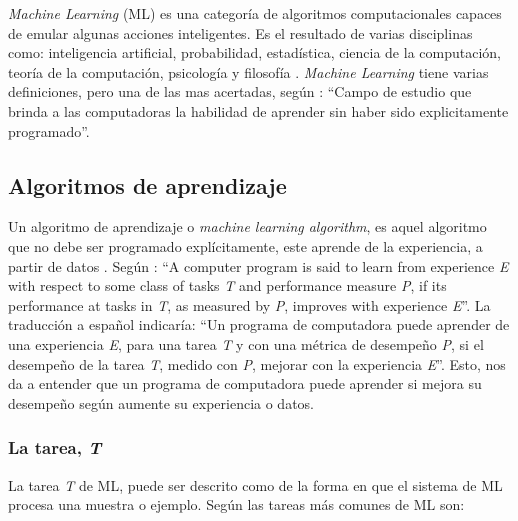\textit{Machine Learning} (ML) es una categoría de algoritmos computacionales capaces de emular algunas acciones inteligentes. Es el resultado de varias disciplinas como: inteligencia artificial, probabilidad, estadística, ciencia de la computación, teoría de la computación, psicología y filosofía \citep{el2022machine}. \textit{Machine Learning}  tiene varias definiciones, pero una de las mas acertadas, según \cite{samuel1967some}: ``Campo de estudio que brinda a las computadoras la habilidad de aprender sin haber sido explicitamente programado''. \\





\subsection{Algoritmos de aprendizaje}

Un algoritmo de aprendizaje o \textit{machine learning algorithm}, es aquel algoritmo que no debe ser programado explícitamente, este aprende de la experiencia, a partir de datos \citep{Goodfellow2016}.  Según \cite{mitchell1997machine}: ``A computer program is said to learn from experience \textit{E} with respect to some class of tasks \textit{T} and performance measure \textit{P}, if its performance at tasks in \textit{T}, as measured by \textit{P}, improves with experience \textit{E}''. La traducción a español indicaría: ``Un programa de computadora puede aprender de una experiencia \textit{E}, para una tarea \textit{T} y con una métrica de desempeño \textit{P}, si el desempeño de la tarea \textit{T}, medido con \textit{P}, mejorar con la experiencia \textit{E}''. Esto, nos da a entender que un programa de computadora puede aprender si mejora su desempeño según aumente su experiencia o datos.



\subsubsection{La tarea, \textit{T}}

La tarea \textit{T} de ML, puede ser descrito como de la forma en que el sistema de ML procesa una muestra o ejemplo. Según \cite{Goodfellow2016} las tareas más comunes de ML son:

